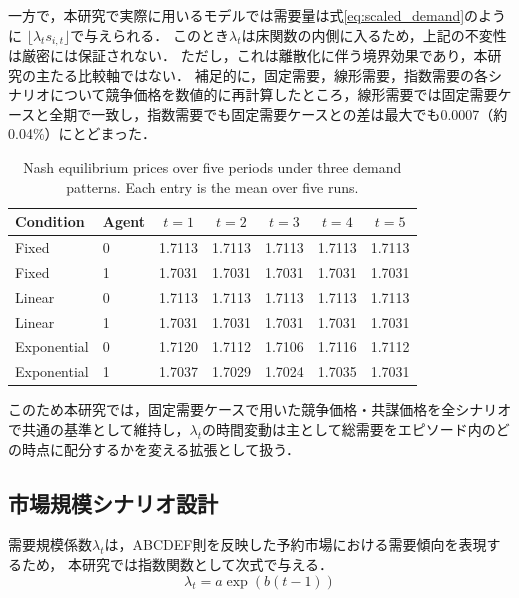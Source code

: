 \documentclass[runningheads]{llncs}
\begin{document}
一方で，本研究で実際に用いるモデルでは需要量は式\eqref{eq:scaled_demand}のように
$\lfloor \lambda_t s_{i,t}\rfloor$で与えられる．
このとき$\lambda_t$は床関数の内側に入るため，上記の不変性は厳密には保証されない．
ただし，これは離散化に伴う境界効果であり，本研究の主たる比較軸ではない．
補足的に，固定需要，線形需要，指数需要の各シナリオについて競争価格を数値的に再計算したところ，線形需要では固定需要ケースと全期で一致し，指数需要でも固定需要ケースとの差は最大でも0.0007（約0.04\%）にとどまった．


\begin{table}[t]
\centering
\small
\setlength{\tabcolsep}{4pt}
\begin{tabular}{llccccc}
\hline
Condition & Agent & $t=1$ & $t=2$ & $t=3$ & $t=4$ & $t=5$ \\
\hline
Fixed        & 0 & 1.7113 & 1.7113 & 1.7113 & 1.7113 & 1.7113 \\
Fixed        & 1 & 1.7031 & 1.7031 & 1.7031 & 1.7031 & 1.7031 \\
Linear       & 0 & 1.7113 & 1.7113 & 1.7113 & 1.7113 & 1.7113 \\
Linear       & 1 & 1.7031 & 1.7031 & 1.7031 & 1.7031 & 1.7031 \\
Exponential  & 0 & 1.7120 & 1.7112 & 1.7106 & 1.7116 & 1.7112 \\
Exponential  & 1 & 1.7037 & 1.7029 & 1.7024 & 1.7035 & 1.7031 \\
\hline
\end{tabular}
\caption{Nash equilibrium prices over five periods under three demand patterns. Each entry is the mean over five runs.}
\label{tab:nash-price-demand-patterns}
\end{table}

\fi

このため本研究では，固定需要ケースで用いた競争価格・共謀価格を全シナリオで共通の基準として維持し，$\lambda_t$の時間変動は主として総需要をエピソード内のどの時点に配分するかを変える拡張として扱う．

\subsection{市場規模シナリオ設計}
需要規模係数$\lambda_t$は，ABCDEF則\cite{ShintaniUmeno2023ABCDEF}を反映した予約市場における需要傾向を表現するため，
本研究では指数関数として次式で与える．
\begin{equation}
\lambda_t = a\exp(b(t-1))
\label{eq:lambda_exp}
\end{equation}
\end{document}
